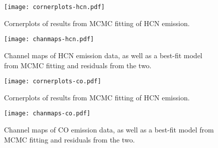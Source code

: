 \begin{figure}[htp]
  \hspace*{\fill}%
  \texttt{[image: cornerplots-hcn.pdf]}\hfill%
  \hspace*{\fill}%
  \caption{Cornerplots of results from MCMC fitting of HCN emission.}
  \label{fig:hcn_cornerplots}
\end{figure}



\begin{figure}[htp]
  \hspace*{\fill}%
  \texttt{[image: chanmaps-hcn.pdf]}\hfill%
  \hspace*{\fill}%
  \caption{Channel maps of HCN emission data, as well as a best-fit model from MCMC fitting and residuals from the two.}
  \label{fig:hcn_chanmaps}
\end{figure}




\begin{figure}[htp]
  \hspace*{\fill}%
  \texttt{[image: cornerplots-co.pdf]}\hfill%
  \hspace*{\fill}%
  \caption{Cornerplots of results from MCMC fitting of HCN emission.}
  \label{fig:co_cornerplots}
\end{figure}


\begin{figure}[htp]
  \hspace*{\fill}%
  \texttt{[image: chanmaps-co.pdf]}\hfill%
  \hspace*{\fill}%
  \caption{Channel maps of CO emission data, as well as a best-fit model from MCMC fitting and residuals from the two.}
  \label{fig:co_chanmaps}
\end{figure}








